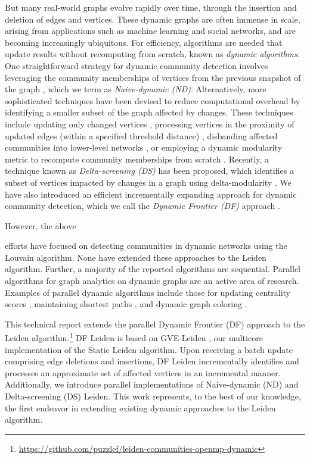 But many real-world graphs evolve rapidly over time, through the insertion and deletion of edges and vertices. These dynamic graphs are often immense in scale, arising from applications such as machine learning and social networks, and are becoming increasingly ubiquitous. For efficiency, algorithms are needed that update results without recomputing from scratch, known as \textit{dynamic algorithms}. One straightforward strategy for dynamic community detection involves leveraging the community memberships of vertices from the previous snapshot of the graph \cite{com-aynaud10, com-chong13, com-shang14, com-zhuang19}, which we term as \textit{Naive-dynamic (ND)}. Alternatively, more sophisticated techniques have been devised to reduce computational overhead by identifying a smaller subset of the graph affected by changes. These techniques include updating only changed vertices \cite{com-aktunc15, com-yin16}, processing vertices in the proximity of updated edges (within a specified threshold distance) \cite{com-held16}, disbanding affected communities into lower-level networks \cite{com-cordeiro16}, or employing a dynamic modularity metric to recompute community memberships from scratch \cite{com-meng16}. Recently, a technique known as \textit{Delta-screening (DS)} has been proposed, which identifies a subset of vertices impacted by changes in a graph using delta-modularity \cite{com-zarayeneh21}. We have also introduced an efficient incrementally expanding approach for dynamic community detection, which we call the \textit{Dynamic Frontier (DF)} approach \cite{sahu2024dflouvain}.

However, the above efforts have focused on detecting communities in dynamic networks using the Louvain algorithm. None have extended these approaches to the Leiden algorithm. Further, a majority of the reported algorithms \cite{com-aynaud10, com-chong13, com-meng16, com-cordeiro16, com-zhuang19, com-zarayeneh21} are sequential. Parallel algorithms for graph analytics on dynamic graphs are an active area of research. Examples of parallel dynamic algorithms include those for updating centrality scores \cite{cent-shao20, cent-regunta21}, maintaining shortest paths \cite{path-zhang17, path-khanda21}, and dynamic graph coloring \cite{color-yuan17, color-bhattacharya18}.

This technical report extends the parallel Dynamic Frontier (DF) approach to the Leiden algorithm.\footnote{\url{https://github.com/puzzlef/leiden-communities-openmp-dynamic}} DF Leiden is based on GVE-Leiden \cite{sahu2023gveleiden}, our multicore implementation of the Static Leiden algorithm. Upon receiving a batch update comprising edge deletions and insertions, DF Leiden incrementally identifies and processes an approximate set of affected vertices in an incremental manner. Additionally, we introduce parallel implementations of Naive-dynamic (ND) and Delta-screening (DS) Leiden. This work represents, to the best of our knowledge, the first endeavor in extending existing dynamic approaches to the Leiden algorithm.




